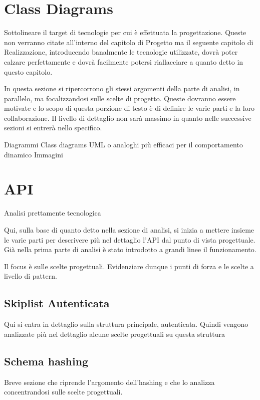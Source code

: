 \section{Class Diagrams}

	Sottolineare il target di tecnologie per cui è effettuata la progettazione. Queste non verranno citate all'interno del capitolo
	di Progetto ma il seguente capitolo di Realizzazione, introducendo banalmente le tecnologie utilizzate, dovrà poter
	calzare perfettamente e dovrà facilmente potersi riallacciare a quanto detto in questo capitolo.

	In questa sezione si ripercorrono gli stessi argomenti della parte di analisi, in parallelo, ma focalizzandosi sulle scelte di
	progetto. Queste dovranno essere motivate e lo scopo di questa porzione di testo è di definire le varie parti e la loro 
	collaborazione. Il livello di dettaglio non sarà massimo in quanto nelle successive sezioni si entrerà nello specifico.

	{Diagrammi} Class diagrams UML o analoghi più efficaci per il comportamento dinamico
	{Immagini}

\section{API}

	{Analisi prettamente tecnologica}
	
	Qui, sulla base di quanto detto nella sezione di analisi, si inizia a mettere insieme le varie parti per descrivere più
	nel dettaglio l'API dal punto di vista progettuale. Già nella prima parte di analisi è stato introdotto a grandi linee il funzionamento.
	
	Il focus è sulle scelte progettuali. Evidenziare dunque i punti di forza e le scelte a livello di pattern.
	
	\subsection{Skiplist Autenticata}
		
		Qui si entra in dettaglio sulla struttura principale, autenticata. Quindi vengono analizzate più nel dettaglio alcune scelte progettuali
		su questa struttura
	
	\subsection{Schema hashing}
	
		Breve sezione che riprende l'argomento dell'hashing e che lo analizza concentrandosi sulle scelte progettuali.
		
